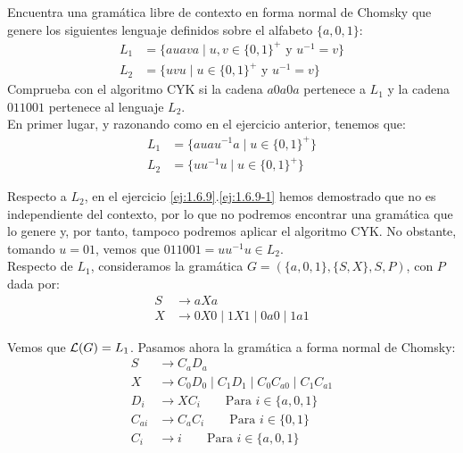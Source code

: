 \begin{ejercicio}\label{ej:1.6.13}
    Encuentra una gramática libre de contexto en forma normal de Chomsky que genere los siguientes lenguaje definidos sobre el alfabeto $\{a,0,1\}$:
    \begin{align*}
        L_1 &= \{auava \mid u,v \in {\{0,1\}}^{+} \text{\ y\ } u^{-1} = v\} \\
        L_2 &= \{uvu \mid u\in {\{0,1\}}^{+}\text{\ y\ } u^{-1} = v\}
    \end{align*}
    Comprueba con el algoritmo CYK si la cadena $a0a0a$ pertenece a $L_1$ y la cadena $011001$ pertenece al lenguaje $L_2$.\\

    En primer lugar, y razonando como en el ejercicio anterior, tenemos que:
    \begin{align*}
        L_1 &= \{auau^{-1}a \mid u \in {\{0,1\}}^{+}\} \\
        L_2 &= \{uu^{-1}u \mid u\in {\{0,1\}}^{+}\}
    \end{align*}

    Respecto a $L_2$, en el ejercicio \ref{ej:1.6.9}.\ref{ej:1.6.9-1} hemos demostrado que no es independiente del contexto, por lo que no podremos encontrar una gramática que lo genere y, por tanto, tampoco podremos aplicar el algoritmo CYK. No obstante, tomando $u=01$, vemos que $011001=uu^{-1}u\in L_2$.\\

    Respecto de $L_1$, consideramos la gramática $G=(\{a,0,1\},\{S,X\},S,P)$, con $P$ dada por:
    \begin{align*}
        S &\rightarrow aXa\\
        X &\rightarrow 0X0 \mid 1X1 \mid 0a0 \mid 1a1
    \end{align*}

    Vemos que $\mathcal{L}(G)=L_1$. Pasamos ahora la gramática a forma normal de Chomsky:
    \begin{align*}
        S &\rightarrow C_aD_a\\
        X &\rightarrow C_0D_0 \mid C_1D_1 \mid C_0C_{a0} \mid C_1C_{a1} \\
        D_i &\rightarrow XC_i \qquad \text{Para } i\in \{a,0,1\} \\
        C_{ai} &\rightarrow C_aC_i \qquad \text{Para } i\in \{0,1\} \\
        C_i &\rightarrow i \qquad \text{Para } i\in \{a,0,1\}
    \end{align*}


\end{ejercicio}
